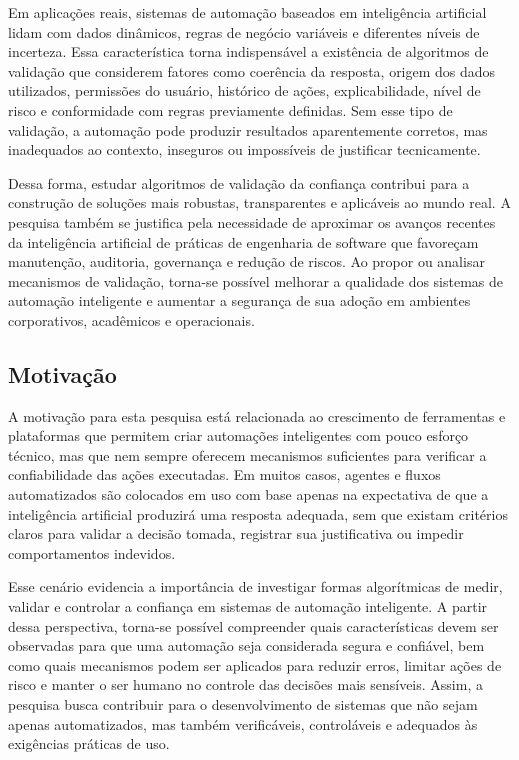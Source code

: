 \documentclass[12pt]{article}
\begin{document}
Em aplicações reais, sistemas de automação baseados em inteligência artificial lidam com dados dinâmicos, regras de negócio variáveis e diferentes níveis de incerteza. Essa característica torna indispensável a existência de algoritmos de validação que considerem fatores como coerência da resposta, origem dos dados utilizados, permissões do usuário, histórico de ações, explicabilidade, nível de risco e conformidade com regras previamente definidas. Sem esse tipo de validação, a automação pode produzir resultados aparentemente corretos, mas inadequados ao contexto, inseguros ou impossíveis de justificar tecnicamente.

Dessa forma, estudar algoritmos de validação da confiança contribui para a construção de soluções mais robustas, transparentes e aplicáveis ao mundo real. A pesquisa também se justifica pela necessidade de aproximar os avanços recentes da inteligência artificial de práticas de engenharia de software que favoreçam manutenção, auditoria, governança e redução de riscos. Ao propor ou analisar mecanismos de validação, torna-se possível melhorar a qualidade dos sistemas de automação inteligente e aumentar a segurança de sua adoção em ambientes corporativos, acadêmicos e operacionais.

\subsection{Motivação}

A motivação para esta pesquisa está relacionada ao crescimento de ferramentas e plataformas que permitem criar automações inteligentes com pouco esforço técnico, mas que nem sempre oferecem mecanismos suficientes para verificar a confiabilidade das ações executadas. Em muitos casos, agentes e fluxos automatizados são colocados em uso com base apenas na expectativa de que a inteligência artificial produzirá uma resposta adequada, sem que existam critérios claros para validar a decisão tomada, registrar sua justificativa ou impedir comportamentos indevidos.

Esse cenário evidencia a importância de investigar formas algorítmicas de medir, validar e controlar a confiança em sistemas de automação inteligente. A partir dessa perspectiva, torna-se possível compreender quais características devem ser observadas para que uma automação seja considerada segura e confiável, bem como quais mecanismos podem ser aplicados para reduzir erros, limitar ações de risco e manter o ser humano no controle das decisões mais sensíveis. Assim, a pesquisa busca contribuir para o desenvolvimento de sistemas que não sejam apenas automatizados, mas também verificáveis, controláveis e adequados às exigências práticas de uso.
\end{document}

